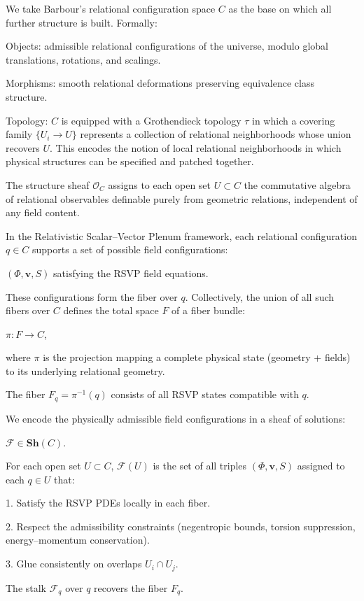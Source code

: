 \documentclass[11pt]{article}
\theoremstyle{plain}
\theoremstyle{definition}
\begin{document}
We take Barbour’s relational configuration space $C$ as the base on which all further structure is built. Formally:

Objects: admissible relational configurations of the universe, modulo global translations, rotations, and scalings.

Morphisms: smooth relational deformations preserving equivalence class structure.

Topology: $C$ is equipped with a Grothendieck topology $\tau$ in which a covering family $\{U_i \to U\}$ represents a collection of relational neighborhoods whose union recovers $U$. This encodes the notion of local relational neighborhoods in which physical structures can be specified and patched together.

The structure sheaf $\mathscr{O}_C$ assigns to each open set $U \subset C$ the commutative algebra of relational observables definable purely from geometric relations, independent of any field content.

In the Relativistic Scalar–Vector Plenum framework, each relational configuration $q \in C$ supports a set of possible field configurations:

$(\Phi, \mathbf{v}, S)$ satisfying the RSVP field equations.

These configurations form the fiber over $q$. Collectively, the union of all such fibers over $C$ defines the total space $F$ of a fiber bundle:

$\pi: F \to C$,

where $\pi$ is the projection mapping a complete physical state (geometry + fields) to its underlying relational geometry.

The fiber $F_q = \pi^{-1}(q)$ consists of all RSVP states compatible with $q$.

We encode the physically admissible field configurations in a sheaf of solutions:

$\mathscr{F} \in \mathbf{Sh}(C)$.

For each open set $U \subset C$, $\mathscr{F}(U)$ is the set of all triples $(\Phi, \mathbf{v}, S)$ assigned to each $q \in U$ that:

1. Satisfy the RSVP PDEs locally in each fiber.

2. Respect the admissibility constraints (negentropic bounds, torsion suppression, energy–momentum conservation).

3. Glue consistently on overlaps $U_i \cap U_j$.

The stalk $\mathscr{F}_q$ over $q$ recovers the fiber $F_q$.
\end{document}
